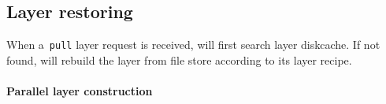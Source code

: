 

\subsection{Layer restoring}
\label{sec:restore-desgin}



When a~\texttt{pull} layer request is received, 
\sysname will first search layer diskcache.
If not found,
\sysname will rebuild the layer from file store according to its layer recipe. 

\paragraph{Parallel layer construction}

